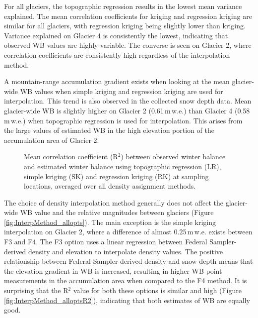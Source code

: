 \documentclass{sfuthesis}
\begin{document}
For all glaciers, the topographic regression results in the lowest mean variance explained. The mean correlation coefficients for kriging and regression kriging are similar for all glaciers, with regression kriging being slightly lower than kriging. Variance explained on Glacier 4 is consistently the lowest, indicating that observed WB values are highly variable. The converse is seen on Glacier 2, where correlation coefficients are consistently high regardless of the interpolation method.

A mountain-range accumulation gradient exists when looking at the mean glacier-wide WB values when simple kriging and regression kriging are used for interpolation. This trend is also observed in the collected snow depth data. Mean glacier-wide WB is slightly higher on Glacier 2 (0.61\,m\,w.e.) than Glacier 4 (0.58\,m\,w.e.) when topographic regression is used for interpolation. This arises from the large values of estimated WB in the high elevation portion of the accumulation area of Glacier 2.

\begin{figure}
	\caption{Mean correlation coefficient (R$^2$) between observed winter balance and estimated winter balance using topographic regression (LR), simple kriging (SK) and regression kriging (RK) at sampling locations, averaged over all density assignment methods.}
	\label{fig:InterpMethod_meanR2}
\end{figure}

The choice of density interpolation method generally does not affect the glacier-wide WB value and the relative magnitudes between glaciers (Figure \ref{fig:InterpMethod_allopts}). The main exception is the simple kriging interpolation on Glacier 2, where a difference of almost 0.25\,m\,w.e. exists between F3 and F4. The F3 option uses a linear regression between Federal Sampler-derived density and elevation to interpolate density values. The positive relationship between Federal Sampler-derived density and snow depth means that the elevation gradient in WB is increased, resulting in higher WB point measurements in the accumulation area when compared to the F4 method.  It is surprising that the R$^2$ value for both these options is similar and high (Figure \ref{fig:InterpMethod_alloptsR2}), indicating that both estimates of WB are equally good.
\end{document}
